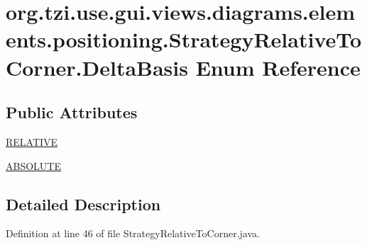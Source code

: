 \hypertarget{enumorg_1_1tzi_1_1use_1_1gui_1_1views_1_1diagrams_1_1elements_1_1positioning_1_1_strategy_relative_to_corner_1_1_delta_basis}{\section{org.\-tzi.\-use.\-gui.\-views.\-diagrams.\-elements.\-positioning.\-Strategy\-Relative\-To\-Corner.\-Delta\-Basis Enum Reference}
\label{enumorg_1_1tzi_1_1use_1_1gui_1_1views_1_1diagrams_1_1elements_1_1positioning_1_1_strategy_relative_to_corner_1_1_delta_basis}
}
\subsection*{Public Attributes}
\begin{DoxyCompactItemize}
\item 
\hyperlink{enumorg_1_1tzi_1_1use_1_1gui_1_1views_1_1diagrams_1_1elements_1_1positioning_1_1_strategy_relative_to_corner_1_1_delta_basis_aef7cb165c38172db4d8eaae2b6da9c80}{R\-E\-L\-A\-T\-I\-V\-E}
\item 
\hyperlink{enumorg_1_1tzi_1_1use_1_1gui_1_1views_1_1diagrams_1_1elements_1_1positioning_1_1_strategy_relative_to_corner_1_1_delta_basis_af542ba02644f6632ccf02e23f36b5698}{A\-B\-S\-O\-L\-U\-T\-E}
\end{DoxyCompactItemize}


\subsection{Detailed Description}


Definition at line 46 of file Strategy\-Relative\-To\-Corner.\-java.



